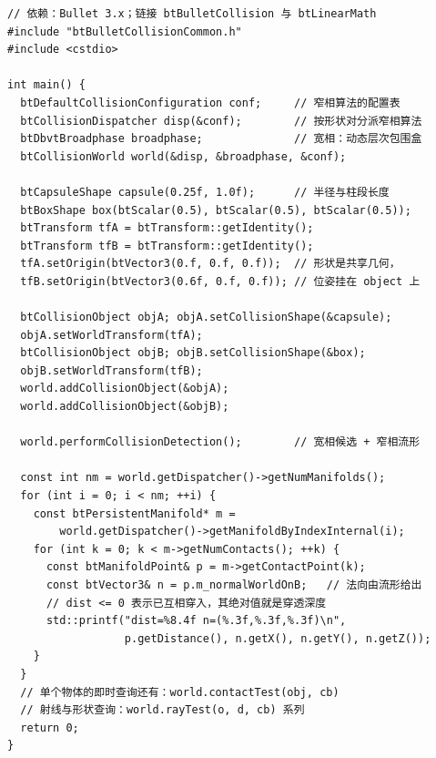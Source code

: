 \documentclass[12pt,a4paper,fontset=fandol]{ctexbook}
\begin{document}
\begin{lstlisting}[style=cppstyle,label={lst:ch10-bullet},caption={Bullet：只用碰撞世界做检测与流形读取，不引入动力学}]
// 依赖：Bullet 3.x；链接 btBulletCollision 与 btLinearMath
#include "btBulletCollisionCommon.h"
#include <cstdio>

int main() {
  btDefaultCollisionConfiguration conf;     // 窄相算法的配置表
  btCollisionDispatcher disp(&conf);        // 按形状对分派窄相算法
  btDbvtBroadphase broadphase;              // 宽相：动态层次包围盒
  btCollisionWorld world(&disp, &broadphase, &conf);

  btCapsuleShape capsule(0.25f, 1.0f);      // 半径与柱段长度
  btBoxShape box(btScalar(0.5), btScalar(0.5), btScalar(0.5));
  btTransform tfA = btTransform::getIdentity();
  btTransform tfB = btTransform::getIdentity();
  tfA.setOrigin(btVector3(0.f, 0.f, 0.f));  // 形状是共享几何，
  tfB.setOrigin(btVector3(0.6f, 0.f, 0.f)); // 位姿挂在 object 上

  btCollisionObject objA; objA.setCollisionShape(&capsule);
  objA.setWorldTransform(tfA);
  btCollisionObject objB; objB.setCollisionShape(&box);
  objB.setWorldTransform(tfB);
  world.addCollisionObject(&objA);
  world.addCollisionObject(&objB);

  world.performCollisionDetection();        // 宽相候选 + 窄相流形

  const int nm = world.getDispatcher()->getNumManifolds();
  for (int i = 0; i < nm; ++i) {
    const btPersistentManifold* m =
        world.getDispatcher()->getManifoldByIndexInternal(i);
    for (int k = 0; k < m->getNumContacts(); ++k) {
      const btManifoldPoint& p = m->getContactPoint(k);
      const btVector3& n = p.m_normalWorldOnB;   // 法向由流形给出
      // dist <= 0 表示已互相穿入，其绝对值就是穿透深度
      std::printf("dist=%8.4f n=(%.3f,%.3f,%.3f)\n",
                  p.getDistance(), n.getX(), n.getY(), n.getZ());
    }
  }
  // 单个物体的即时查询还有：world.contactTest(obj, cb)
  // 射线与形状查询：world.rayTest(o, d, cb) 系列
  return 0;
}
\end{lstlisting}
\end{document}
